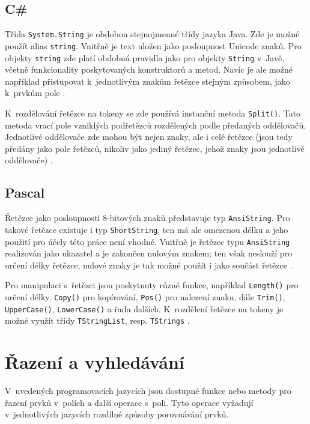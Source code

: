 \documentclass[onepage, a4paper, 12pt]{bakalarka}
\begin{document}
\subsection{C\#}
Třída \texttt{System.String} je obdobou stejnojmenné třídy jazyka Java. Zde je možné použít alias \texttt{string}. Vnitřně je text uložen jako posloupnost Unicode znaků. Pro objekty \texttt{string} zde platí obdobná pravidla jako pro objekty \texttt{String} v~Javě, včetně funkcionality poskytovaných konstruktorů a metod. Navíc je ale možné například přistupovat k~jednotlivým znakům řetězce stejným způsobem, jako k~prvkům pole \cite{cs-guide-stringclass}.\par
K~rozdělování řetězce na tokeny se zde používá instanční metoda \texttt{Split()}. Tato metoda vrací pole vzniklých podřetězců rozdělených podle předaných oddělovačů. Jednotlivé oddělovače zde mohou být nejen znaky, ale i celé řetězce (jsou tedy předány jako pole řetězců, nikoliv jako jediný řetězec, jehož znaky jsou jednotlivé oddělovače) \cite{cs-guide-stringsplit}.

\subsection{Pascal}
Řetězce jako posloupnosti 8-bitových znaků představuje typ \texttt{AnsiString}. Pro takové řetězce existuje i typ \texttt{ShortString}, ten má ale omezenou délku a jeho použití pro účely této práce není vhodné. Vnitřně je řetězec typu \texttt{AnsiString} realizován jako ukazatel a je zakončen nulovým znakem; ten však neslouží pro určení délky řetězce, nulové znaky je tak možné použít i jako součást řetězce \cite{pas-guide-strings, pas-guide-shortstring, pas-guide-ansistring}.\par
Pro manipulaci s~řetězci jsou poskytnuty různé funkce, například \texttt{Length()} pro určení délky, \texttt{Copy()} pro kopírování, \texttt{Pos()} pro nalezení znaku, dále \texttt{Trim()}, \texttt{UpperCase()}, \texttt{LowerCase()} a řada dalších. K~rozdělení řetězce na tokeny je možné využít třídy \texttt{TStringList}, resp. \texttt{TStrings} \cite{pas-guide-system, pas-guide-tstringlist, pas-guide-tstrings}.

\section{Řazení a vyhledávání}\label{sec:sorting}
V~uvedených programovacích jazycích jsou dostupné funkce nebo metody pro řazení prvků v~polích a další operace s~poli. Tyto operace vyžadují v~jednotlivých jazycích rozdílné způsoby porovnávání prvků.
\end{document}
